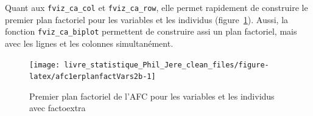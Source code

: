 \documentclass[
  11pt,
  french,
]{book}
\makeatletter
\newenvironment{Shaded}{\begin{snugshade}}{\end{snugshade}}
\newcommand{\DataTypeTok}[1]{\textcolor[rgb]{0.13,0.29,0.53}{#1}}
\newcommand{\DecValTok}[1]{\textcolor[rgb]{0.00,0.00,0.81}{#1}}
\newcommand{\KeywordTok}[1]{\textcolor[rgb]{0.13,0.29,0.53}{\textbf{#1}}}
\newcommand{\NormalTok}[1]{#1}
\newcommand{\OtherTok}[1]{\textcolor[rgb]{0.56,0.35,0.01}{#1}}
\newcommand{\StringTok}[1]{\textcolor[rgb]{0.31,0.60,0.02}{#1}}
\newenvironment{kframe}{%
\medskip{}
\setlength{\fboxsep}{.8em}
 \def\at@end@of@kframe{}%
 \ifinner\ifhmode%
  \def\at@end@of@kframe{\end{minipage}}%
  \begin{minipage}{\columnwidth}%
 \fi\fi%
 \def\FrameCommand##1{\hskip\@totalleftmargin \hskip-\fboxsep
 \colorbox{shadecolor}{##1}\hskip-\fboxsep
     \hskip-\linewidth \hskip-\@totalleftmargin \hskip\columnwidth}%
 \MakeFramed {\advance\hsize-\width
   \@totalleftmargin\z@ \linewidth\hsize
   \@setminipage}}%
 {\par\unskip\endMakeFramed%
 \at@end@of@kframe}
\renewenvironment{Shaded}{\begin{kframe}}{\end{kframe}}
\makeatother
\begin{document}
Quant aux \texttt{fviz\_ca\_col} et \texttt{fviz\_ca\_row}, elle permet rapidement de construire le premier plan factoriel pour les variables et les individus (figure~\ref{fig:afc1erplanfactVars2b}). Aussi, la fonction \texttt{fviz\_ca\_biplot} permettent de construire assi un plan factoriel, mais avec les lignes et les colonnes simultanément.

\begin{Shaded}
\end{Shaded}

\begin{figure}

{\centering \texttt{[image: livre\_statistique\_Phil\_Jere\_clean\_files/figure-latex/afc1erplanfactVars2b-1]} 

}

\caption{Premier plan factoriel de l'AFC pour les variables et les individus avec factoextra}\label{fig:afc1erplanfactVars2b}
\end{figure}
\end{document}
